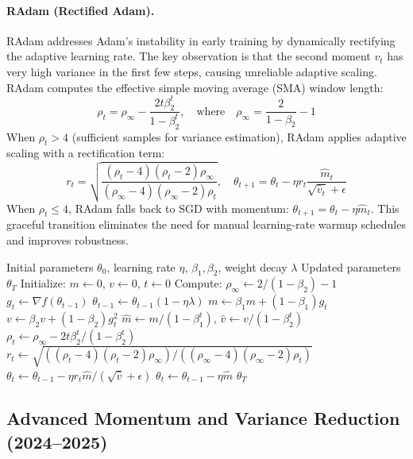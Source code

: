\paragraph{RAdam (Rectified Adam).}
RAdam addresses Adam's instability in early training by dynamically rectifying the adaptive learning rate. The key observation is that the second moment $v_t$ has very high variance in the first few steps, causing unreliable adaptive scaling. RAdam computes the effective simple moving average (SMA) window length:
\[\rho_t = \rho_{\infty} - \frac{2t\beta_2^t}{1-\beta_2^t}, \quad \text{where} \quad \rho_{\infty} = \frac{2}{1-\beta_2}-1\]
When $\rho_t > 4$ (sufficient samples for variance estimation), RAdam applies adaptive scaling with a rectification term:
\[r_t = \sqrt{\frac{(\rho_t-4)(\rho_t-2)\rho_{\infty}}{(\rho_{\infty}-4)(\rho_{\infty}-2)\rho_t}}, \quad \theta_{t+1} = \theta_t - \eta r_t \frac{\hat{m}_t}{\sqrt{\hat{v}_t}+\epsilon}\]
When $\rho_t \leq 4$, RAdam falls back to SGD with momentum: $\theta_{t+1} = \theta_t - \eta\hat{m}_t$. This graceful transition eliminates the need for manual learning-rate warmup schedules and improves robustness.

\begin{algorithm}[H]
\caption{RAdam (Rectified Adam)}
\label{alg:radam}
\begin{algorithmic}[1]
\Require Initial parameters $\theta_0$, learning rate $\eta$, $\beta_1, \beta_2$, weight decay $\lambda$
\Ensure Updated parameters $\theta_T$
\State Initialize: $m \gets 0$, $v \gets 0$, $t \gets 0$
\State Compute: $\rho_\infty \gets 2/(1-\beta_2) - 1$
    \State $g_t \gets \nabla f(\theta_{t-1})$
        \State $\theta_{t-1} \gets \theta_{t-1}(1 - \eta\lambda)$
    \EndIf
    \State $m \gets \beta_1 m + (1-\beta_1) g_t$
    \State $v \gets \beta_2 v + (1-\beta_2) g_t^2$
    \State $\hat{m} \gets m/(1-\beta_1^t)$, $\hat{v} \gets v/(1-\beta_2^t)$
    \State $\rho_t \gets \rho_\infty - 2t \beta_2^t / (1 - \beta_2^t)$
        \State $r_t \gets \sqrt{((\rho_t-4)(\rho_t-2)\rho_\infty) / ((\rho_\infty-4)(\rho_\infty-2)\rho_t)}$
        \State $\theta_t \gets \theta_{t-1} - \eta r_t \hat{m} / (\sqrt{\hat{v}} + \epsilon)$
    \Else
        \State $\theta_t \gets \theta_{t-1} - \eta \hat{m}$ 
    \EndIf
\EndFor
\Return $\theta_T$
\end{algorithmic}
\end{algorithm}

\subsection{Advanced Momentum and Variance Reduction (2024--2025)}
